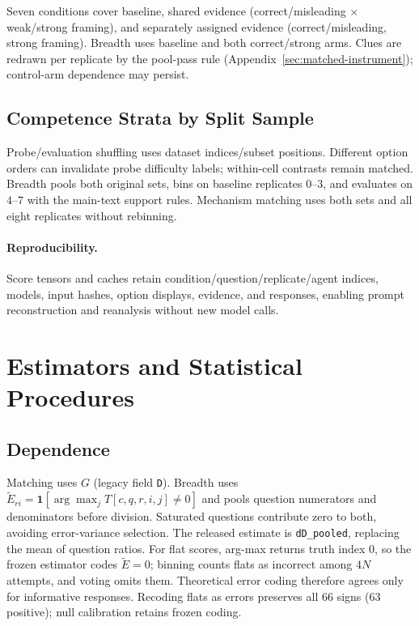 \documentclass[11pt,a4paper]{article}
\theoremstyle{definition}
\begin{document}
Seven conditions cover baseline, shared evidence (correct/misleading
$\times$ weak/strong framing), and separately assigned evidence
(correct/misleading, strong framing). Breadth uses baseline and both
correct/strong arms. Clues are redrawn per replicate by the pool-pass rule
(Appendix~\ref{sec:matched-instrument}); control-arm dependence may persist.

\subsection{Competence Strata by Split Sample}
\label{sec:app-strata}

Probe/evaluation shuffling uses dataset indices/subset positions. Different
option orders can invalidate probe difficulty labels; within-cell contrasts
remain matched. Breadth pools both original sets, bins on baseline replicates
$0$--$3$, and evaluates on $4$--$7$ with the main-text support rules.
Mechanism matching uses both sets and all eight replicates without rebinning.

\paragraph{Reproducibility.}
\label{sec:app-repro}
Score tensors and caches retain condition/question/replicate/agent indices,
models, input hashes, option displays, evidence, and responses, enabling
prompt reconstruction and reanalysis without new model calls.

\section{Estimators and Statistical Procedures}
\label{sec:app-estimators}

\subsection{Dependence}
\label{sec:app-est-dep}

Matching uses $G$ (legacy field \texttt{D}). Breadth uses
$\widetilde E_{ri}=\mathbf1[\arg\max_j T[c,q,r,i,j]\neq0]$ and pools
question numerators and denominators before division. Saturated questions
contribute zero to both, avoiding error-variance selection. The released
estimate is \texttt{dD\_pooled}, replacing the mean of question ratios.
For flat scores, arg-max returns truth index $0$, so the frozen estimator
codes $\widetilde E=0$; binning counts flats as incorrect among $4N$ attempts,
and voting omits them. Theoretical error coding therefore agrees only for
informative responses. Recoding flats as errors preserves all $66$ signs
($63$ positive); null calibration retains frozen coding.
\end{document}
